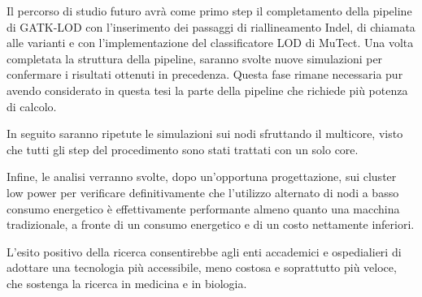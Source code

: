 Il percorso di studio futuro avrà come primo step il completamento della pipeline di GATK-LOD con l'inserimento dei passaggi di riallineamento Indel, di chiamata alle varianti e con l'implementazione del classificatore LOD di MuTect.
Una volta completata la struttura della pipeline, saranno svolte nuove simulazioni per confermare i risultati ottenuti in precedenza.
Questa fase rimane necessaria pur avendo considerato in questa tesi la parte della pipeline che richiede più potenza di calcolo.

In seguito saranno ripetute le simulazioni sui nodi sfruttando il multicore, visto che tutti gli step del procedimento sono stati trattati con un solo core.

Infine, le analisi verranno svolte, dopo un'opportuna progettazione, sui cluster low power per verificare definitivamente che l'utilizzo alternato di nodi a basso consumo energetico è effettivamente performante almeno quanto una macchina tradizionale, a fronte di un consumo energetico e di un costo nettamente inferiori.

L'esito positivo della ricerca consentirebbe agli enti accademici e ospedialieri di adottare una tecnologia più accessibile, meno costosa e soprattutto più veloce, che sostenga la ricerca in medicina e in biologia.


